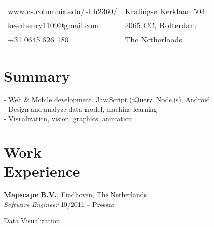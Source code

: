 \documentclass[margin,line]{resume}
\begin{document}
\begin{resume}

      \begin{tabular}{@{}p{6cm}p{8.5cm}}
      \url{www.cs.columbia.edu/~hh2360/}  &  Kralingse Kerklaan 504 \\
      keenhenry1109@gmail.com             &  3065 CC, Rotterdam \\
      +31-0645-626-180	& The Netherlands \\
      \end{tabular}

 
    \section{\mysidestyle Summary}
      
      - Web \& Mobile development, JavaScript (jQuery, Node.js), Android \\
      - Design and analyze data model, machine learning \\
      - Visualization, vision, graphics, animation \\
      
    \section{\mysidestyle Work \\ Experience}

    \textbf{Mapscape B.V.}, Eindhoven, The Netherlands \\
    \textsl{Software Engineer} \hfill 10/2011 -- Present \vspace{-3mm}\\\vspace{-1mm}%
      \begin{list2}
      \item Data Visualization  %
      \end{list2}


\end{resume}
\end{document}
